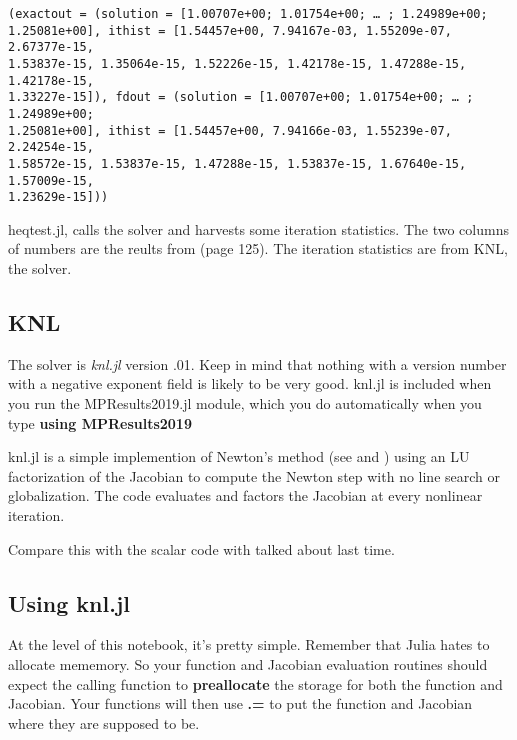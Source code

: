 \documentclass[11pt]{article}
\newcommand{\prompt}[4]{
        \llap{{\color{#2}[#3]: #4}}\vspace{-1.25em}
    }
\begin{document}
            \begin{tcolorbox}[breakable, boxrule=.5pt, size=fbox, pad at break*=1mm, opacityfill=0]
\prompt{Out}{outcolor}{8}{\hspace{3.5pt}}
\begin{Verbatim}[commandchars=\\\{\}]
(exactout = (solution = [1.00707e+00; 1.01754e+00; … ; 1.24989e+00;
1.25081e+00], ithist = [1.54457e+00, 7.94167e-03, 1.55209e-07, 2.67377e-15,
1.53837e-15, 1.35064e-15, 1.52226e-15, 1.42178e-15, 1.47288e-15, 1.42178e-15,
1.33227e-15]), fdout = (solution = [1.00707e+00; 1.01754e+00; … ; 1.24989e+00;
1.25081e+00], ithist = [1.54457e+00, 7.94166e-03, 1.55239e-07, 2.24254e-15,
1.58572e-15, 1.53837e-15, 1.47288e-15, 1.53837e-15, 1.67640e-15, 1.57009e-15,
1.23629e-15]))
\end{Verbatim}
\end{tcolorbox}
        
    heqtest.jl, calls the solver and harvests some iteration statistics. The
two columns of numbers are the reults from \cite{chand} (page 125). The
iteration statistics are from KNL, the solver.

    \hypertarget{knl}{%
\subsection{KNL}\label{knl}}

The solver is \emph{knl.jl} version .01. Keep in mind that nothing with
a version number with a negative exponent field is likely to be very
good. knl.jl is included when you run the MPResults2019.jl module, which
you do automatically when you type \textbf{using MPResults2019}

knl.jl is a simple implemention of Newton's method (see \cite{ctk:roots}
and \cite{ctk:newton} ) using an LU factorization of the Jacobian to
compute the Newton step with no line search or globalization. The code
evaluates and factors the Jacobian at every nonlinear iteration.

Compare this with the scalar code with talked about last time.

    \hypertarget{using-knl.jl}{%
\subsection{Using knl.jl}\label{using-knl.jl}}

At the level of this notebook, it's pretty simple. Remember that Julia
hates to allocate mememory. So your function and Jacobian evaluation
routines should expect the calling function to \textbf{preallocate} the
storage for both the function and Jacobian. Your functions will then use
\textbf{.=} to put the function and Jacobian where they are supposed to
be.
\end{document}
